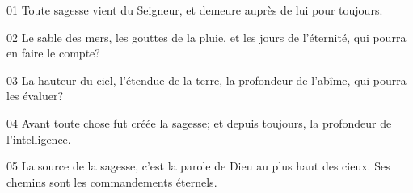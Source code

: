 01 Toute sagesse vient du Seigneur, et demeure auprès de lui pour toujours.

02 Le sable des mers, les gouttes de la pluie, et les jours de l’éternité, qui pourra en faire le compte?

03 La hauteur du ciel, l’étendue de la terre, la profondeur de l’abîme, qui pourra les évaluer?

04 Avant toute chose fut créée la sagesse; et depuis toujours, la profondeur de l’intelligence.

05 La source de la sagesse, c’est la parole de Dieu au plus haut des cieux. Ses chemins sont les commandements éternels.
